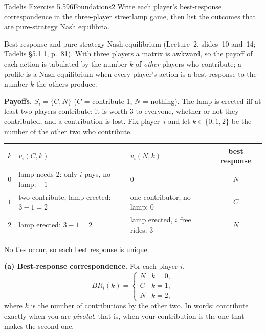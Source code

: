 \begin{exsol}{Tadelis Exercise 5.5}{96}{Foundations}{2}
\asked Write each player's best-response correspondence in the three-player streetlamp game, then
list the outcomes that are pure-strategy Nash equilibria.

\method Best response and pure-strategy Nash equilibrium (Lecture~2, slides~10 and~14; Tadelis
\S5.1.1, p.~81). With three players a matrix is awkward, so the payoff of each action is tabulated
by the number $k$ of \emph{other} players who contribute; a profile is a Nash equilibrium when
every player's action is a best response to the number $k$ the others produce.

\solution
\textbf{Payoffs.} $S_i = \{C, N\}$ ($C$ = contribute 1, $N$ = nothing). The lamp is erected iff at
least two players contribute; it is worth $3$ to everyone, whether or not they contributed, and a
contribution is lost. Fix player~$i$ and let $k \in \{0,1,2\}$ be the number of the other two who
contribute.
\begin{center}
\begin{tabular}{c|p{4.1cm}p{4.1cm}|c}
\toprule
$k$ & $v_i(C, k)$ & $v_i(N, k)$ & best response \\
\midrule
$0$ & lamp needs 2: only $i$ pays, no lamp: $-1$ & $0$ & $N$ \\
$1$ & two contribute, lamp erected: $3 - 1 = 2$ & one contributor, no lamp: $0$ & $C$ \\
$2$ & lamp erected: $3 - 1 = 2$ & lamp erected, $i$ free rides: $3$ & $N$ \\
\bottomrule
\end{tabular}
\end{center}
No ties occur, so each best response is unique.

\textbf{(a) Best-response correspondence.} For each player $i$,
\[
  BR_i(k) = \begin{cases} N & k = 0,\\ C & k = 1,\\ N & k = 2,\end{cases}
\]
where $k$ is the number of contributions by the other two. In words: contribute exactly when you
are \emph{pivotal}, that is, when your contribution is the one that makes the second one.


\end{exsol}
